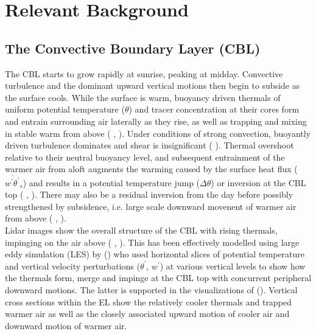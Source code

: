 
\section{Relevant Background}
\label{sec:}
\subsection{The Convective Boundary Layer (CBL)}

The \acs{CBL} starts to grow rapidly at sunrise, peaking at midday.  Convective turbulence and the dominant upward vertical motions then begin to subside as the surface cools.  While the surface is warm, buoyancy driven thermals of uniform potential temperature ($\theta$) and tracer concentration at their cores form and entrain surrounding air laterally as they rise, as well as trapping and mixing in stable warm from above (\citeauthor{Stull-BLMetIntro} \citeyear{Stull-BLMetIntro}, \citeauthor{CrumStullEl} \citeyear{CrumStullEl}).  Under conditions of strong convection, buoyantly driven turbulence dominates and shear is insignificant (\citeauthor{DirLEddy} \citeyear{DirLEddy}). Thermal overshoot relative to their neutral buoyancy level, and subsequent entrainment of the warmer air from aloft augments the warming caused by the surface heat flux ($\overline{w^{'}\theta^{'}}_{s}$) and results in a potential temperature jump ($\Delta \theta$) or inversion at the \acs{CBL} top (\citeauthor{SchmidtSchu} \citeyear{SchmidtSchu}, \citeauthor{Turner86} \citeyear{Turner86}).  There may also be a residual inversion from the day before possibly strengthened by subsidence, i.e. large scale downward movenent of warmer air from above (\citeauthor{Stull-BLMetIntro} \citeyear{Stull-BLMetIntro}, \citeauthor{SullMoengStev} \citeyear{SullMoengStev}).\\  

Lidar images show the overall structure of the \acs{CBL} with rising thermals, impinging on the air above (\citeauthor{CrumStullEl} \citeyear{CrumStullEl}, \citeauthor{Traum11} \citeyear{Traum11}).  This has been effectively modelled using large eddy simulation (\acs{LES}) by \citeauthor{SchmidtSchu} (\citeyear{SchmidtSchu}) who used horizontal slices of potential temperature and vertical velocity perturbations ($\theta^{'}$, $w^{'}$) at various vertical levels to show how the thermals form, merge and impinge at the \acs{CBL} top with concurrent peripheral downward motions.  The latter is supported in the visualizations of \citeauthor{SullMoengStev} (\citeyear{SullMoengStev}).  Vertical cross sections within the \acs{EL} show the relatively cooler thermals and trapped warmer air as well as the closely associated upward motion of cooler air and downward motion of warmer air.\\ 

